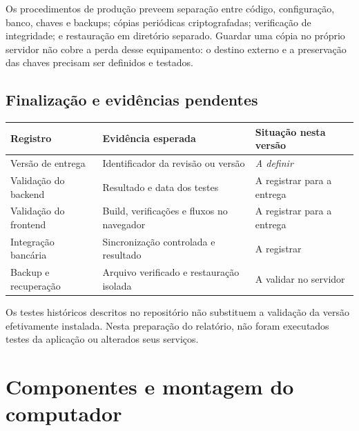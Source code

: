 \documentclass[11pt,a4paper,oneside]{report}
\newcommand{\pendente}{\textit{A definir}}
\begin{document}
Os procedimentos de produção preveem separação entre código, configuração,
banco, chaves e backups; cópias periódicas criptografadas; verificação de
integridade; e restauração em diretório separado. Guardar uma cópia no próprio
servidor não cobre a perda desse equipamento: o destino externo e a preservação
das chaves precisam ser definidos e testados.

\section{Finalização e evidências pendentes}
\begin{tabularx}{\textwidth}{@{}p{4cm}YY@{}}
\toprule
Registro & Evidência esperada & Situação nesta versão \\
\midrule
Versão de entrega & Identificador da revisão ou versão & \pendente \\
Validação do backend & Resultado e data dos testes & A registrar para a entrega \\
Validação do frontend & Build, verificações e fluxos no navegador & A registrar para a entrega \\
Integração bancária & Sincronização controlada e resultado & A registrar \\
Backup e recuperação & Arquivo verificado e restauração isolada & A validar no servidor \\
\bottomrule
\end{tabularx}
Os testes históricos descritos no repositório não substituem a validação da
versão efetivamente instalada. Nesta preparação do relatório, não foram
executados testes da aplicação ou alterados seus serviços.

\chapter{Componentes e montagem do computador}
\end{document}
